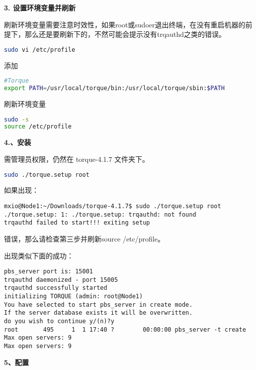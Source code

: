 {\textbf{3. 设置环境变量并刷新}

刷新环境变量需要注意时效性，如果root或sudoer退出终端，在没有重启机器的前提下，那么还是要刷新下的，不然可能会提示没有trqauthd之类的错误。
\begin{lstlisting}[language=sh]
sudo vi /etc/profile
\end{lstlisting}
添加
\begin{lstlisting}[language=sh]
#Torque
export PATH=/usr/local/torque/bin:/usr/local/torque/sbin:$PATH
\end{lstlisting}
刷新环境变量
\begin{lstlisting}[language=sh]
sudo -s
source /etc/profile
\end{lstlisting}

\textbf{4.、安装}

需管理员权限，仍然在 torque-4.1.7 文件夹下。
\begin{lstlisting}[language=sh]
sudo ./torque.setup root
\end{lstlisting}
如果出现：
\begin{verbatim}
mxio@Node1:~/Downloads/torque-4.1.7$ sudo ./torque.setup root
./torque.setup: 1: ./torque.setup: trqauthd: not found
trqauthd failed to start!!! exiting setup 
\end{verbatim}
错误，那么请检查第三步并刷新source /etc/profile。

出现类似下面的成功：
\begin{verbatim}
pbs_server port is: 15001
trqauthd daemonized - port 15005
trqauthd successfully started
initializing TORQUE (admin: root@Node1)
You have selected to start pbs_server in create mode.
If the server database exists it will be overwritten.
do you wish to continue y/(n)?y
root       495     1  1 17:40 ?        00:00:00 pbs_server -t create
Max open servers: 9
Max open servers: 9
\end{verbatim}


\textbf{5、配置}

}
